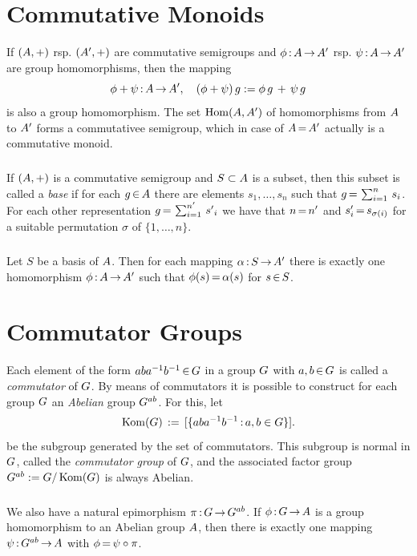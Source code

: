 \documentclass[11pt,twoside]{article}
\begin{document}
\section{Commutative Monoids}
If $(A,+)$ rsp. $(A',+)$ are commutative semigroups and
$\phi {\,:\,} A {\,\to\,} A'$ rsp. $\psi {\,:\,} A {\,\to\,} A'$
are group homomorphisms,
then the mapping
\[
\phi + \psi{\,:\,} A {\,\to\,} A', \quad
(\phi+\psi)\,g := \phi \,g \,+\, \psi \,g
\]
is also a group homomorphism.
The set $\operatorname{Hom}(A,A')$ of homomorphisms
from $A$ to $A'$ forms a commutativee semigroup,
which in case of $A {\,=\,} A'$ actually is a commutative monoid.

\subparagraph{}
If $(A,+)$ is a commutative semigroup and $S \subset A$ is a subset,
then this subset is called a \textit{base}
if for each $g {\,\in\,} A$ there are elements $s_1,\ldots,s_n$
such that $g {\,=\,} \sum_{i=1}^n \,s_i$.
For each other representation $g {\,=\,} \sum_{i=1}^{n'} \,{s'}_i$ we have
that $n {\,=\,} n'$ and $s'_i {\,=\,} s_{\sigma(i)}$ for a suitable permutation
$\sigma$ of $\{1,\ldots,n\}$.

\subparagraph{}
Let $S$ be a basis of $A$.
Then for each mapping $\alpha {\,:\,} S {\,\to\,} A'$ there is exactly one
homomorphism $\phi{\,:\,}A {\,\to\,} A'$
such that $\phi(s) {\,=\,} \alpha(s)$ for $s {\,\in\,} S$.

\section{Commutator Groups}
Each element of the form $aba^{-1}b^{-1} {\,\in\,} G$ in a group
$G$ with $a,b {\,\in\,} G$ is called a \textit{commutator} of $G$.
By means of commutators it is possible to construct for each group $G$
an \textit{Abelian} group $G^{ab}$.
For this, let
\[
\operatorname{Kom}(G) \,:=\, [\{aba^{-1}b^{-1} {\,:\,} a,b \in G\}].
\]
be the subgroup generated by the set of commutators.
This subgroup is normal in $G$,
called the \textit{commutator group} of $G$,
and the associated factor group $G^{ab} := G / \operatorname{Kom}(G)$
is always Abelian.

\subparagraph{}
We also have a natural epimorphism $\pi {\,:\,} G {\,\to\,} G^{ab}$.
If $\phi {\,:\,} G {\,\to\,} A$ is a group homomorphism
to an Abelian group $A$,
then there is exactly one mapping
$\psi{\,:\,} G^{ab} {\,\to\,} A$ with $\phi {\,=\,} \psi \circ \pi$.
\end{document}
